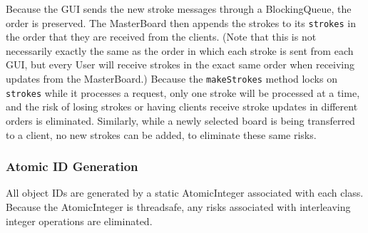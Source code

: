 Because the GUI sends the new stroke messages through a BlockingQueue, the order is preserved. The MasterBoard then appends the strokes to its \texttt{strokes} in the order that they are received from the clients. (Note that this is not necessarily exactly the same as the order in which each stroke is sent from each GUI, but every User will receive strokes in the exact same order when receiving updates from the MasterBoard.) Because the \texttt{makeStrokes} method locks on \texttt{strokes} while it processes a request, only one stroke will be processed at a time, and the risk of losing strokes or having clients receive stroke updates in different orders is eliminated. Similarly, while a newly selected board is being transferred to a client, no new strokes can be added, to eliminate these same risks.

\subsubsection{Atomic ID Generation}

All object IDs are generated by a static AtomicInteger associated with each class. Because the AtomicInteger is threadsafe, any risks associated with interleaving integer operations are eliminated.
